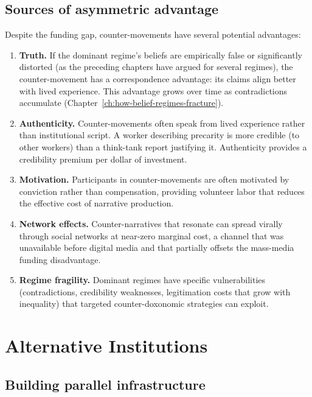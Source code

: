\subsection{Sources of asymmetric advantage}

Despite the funding gap, counter-movements have several potential advantages:

\begin{enumerate}
  \item \textbf{Truth.}
  If the dominant regime's beliefs are empirically false or significantly distorted (as the preceding chapters have argued for several regimes), the counter-movement has a correspondence advantage: its claims align better with lived experience.
  This advantage grows over time as contradictions accumulate (Chapter~\ref{ch:how-belief-regimes-fracture}).

  \item \textbf{Authenticity.}
  Counter-movements often speak from lived experience rather than institutional script.
  A worker describing precarity is more credible (to other workers) than a think-tank report justifying it.
  Authenticity provides a credibility premium per dollar of investment.

  \item \textbf{Motivation.}
  Participants in counter-movements are often motivated by conviction rather than compensation, providing volunteer labor that reduces the effective cost of narrative production.

  \item \textbf{Network effects.}
  Counter-narratives that resonate can spread virally through social networks at near-zero marginal cost, a channel that was unavailable before digital media and that partially offsets the mass-media funding disadvantage.

  \item \textbf{Regime fragility.}
  Dominant regimes have specific vulnerabilities (contradictions, credibility weaknesses, legitimation costs that grow with inequality) that targeted counter-doxonomic strategies can exploit.
\end{enumerate}

\section{Alternative Institutions}
\label{sec:ch31-alternatives}

\subsection{Building parallel infrastructure}

